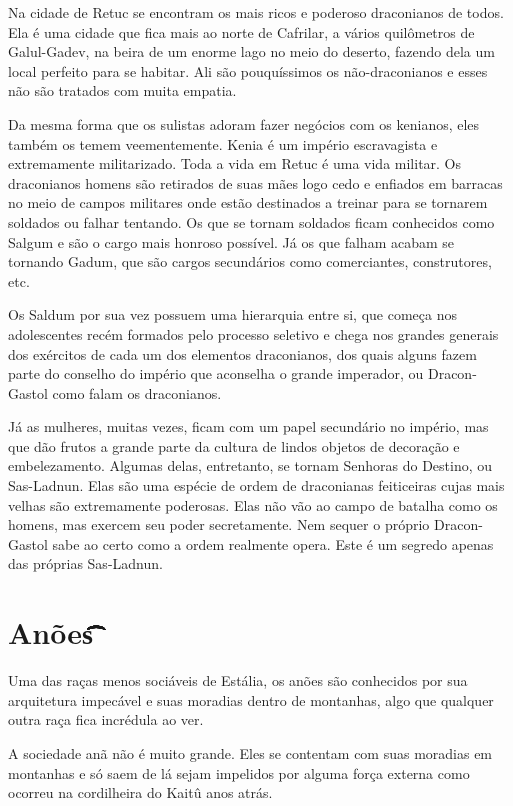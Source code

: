 \documentclass{RPG_Adventure}[2021/10/20]
\begin{document}
Na cidade de Retuc se encontram os mais ricos e poderoso draconianos de todos.
Ela é uma cidade que fica mais ao norte de Cafrilar, a vários quilômetros de
Galul-Gadev, na beira de um enorme lago no meio do deserto, fazendo dela um
local perfeito para se habitar. Ali são pouquíssimos os não-draconianos e esses
não são tratados com muita empatia.

Da mesma forma que os sulistas adoram fazer negócios com os kenianos, eles
também os temem veementemente. Kenia é um império escravagista e extremamente
militarizado. Toda a vida em Retuc é uma vida militar. Os draconianos homens são
retirados de suas mães logo cedo e enfiados em barracas no meio de campos
militares onde estão destinados a treinar para se tornarem soldados ou falhar
tentando. Os que se tornam soldados ficam conhecidos como Salgum e são o cargo
mais honroso possível. Já os que falham acabam se tornando Gadum, que são cargos
secundários como comerciantes, construtores, etc.

Os Saldum por sua vez possuem uma hierarquia entre si, que começa nos
adolescentes recém formados pelo processo seletivo e chega nos grandes generais
dos exércitos de cada um dos elementos draconianos, dos quais alguns fazem parte
do conselho do império que aconselha o grande imperador, ou Dracon-Gastol como
falam os draconianos.

Já as mulheres, muitas vezes, ficam com um papel secundário no império, mas que
dão frutos a grande parte da cultura de lindos objetos de decoração e
embelezamento. Algumas delas, entretanto, se tornam Senhoras do Destino, ou
Sas-Ladnun. Elas são uma espécie de ordem de draconianas feiticeiras cujas mais
velhas são extremamente poderosas. Elas não vão ao campo de batalha como os
homens, mas exercem seu poder secretamente. Nem sequer o próprio Dracon-Gastol
sabe ao certo como a ordem realmente opera. Este é um segredo apenas das
próprias Sas-Ladnun.

\section*{Anões\t\t\t\t\t\t\t\t\t\t\t\t\t\t\t}%
\label{sec:anoes}

Uma das raças menos sociáveis de Estália, os anões são conhecidos por sua
arquitetura impecável e suas moradias dentro de montanhas, algo que qualquer
outra raça fica incrédula ao ver.

A sociedade anã não é muito grande. Eles se contentam com suas moradias em
montanhas e só saem de lá sejam impelidos por alguma força externa como ocorreu
na cordilheira do Kaitû anos atrás.
\end{document}
